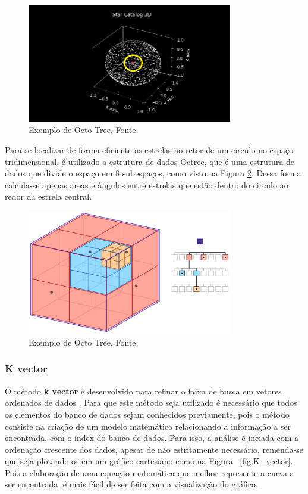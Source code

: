 \begin{figure}[H]
    \centering
    \includegraphics[width=0.8\textwidth]{images/estrelas_endorno.png}
    \caption{Exemplo de Octo Tree, Fonte: \cite{octo_tree}}
    \label{fig:estrelas_endorno}
\end{figure}

Para se localizar de forma eficiente as estrelas ao retor de um circulo no espaço tridimensional, é utilizado a estrutura de dados Octree,
que é uma estrutura de dados que divide o espaço em 8 subespaços, como visto na Figura \ref{fig:octo_tree}. 
Dessa forma calcula-se apenas areas e ângulos entre estrelas que estão dentro do circulo ao redor da estrela central.

\begin{figure}[H]
    \centering
    \includegraphics[width=0.8\textwidth]{images/octree.png}
    \caption{Exemplo de Octo Tree, Fonte: \cite{octo_tree}}
    \label{fig:octo_tree}
\end{figure}

\subsubsection{K vector}

O método \textbf{k vector} é desenvolvido para refinar o faixa de busca em vetores ordenados de dados \cite{Mortari}.
Para que este método seja utilizado é necessário que todos os elementos do banco de dados sejam conhecidos previamente, 
pois o método consiste na criação de um modelo matemático relacionando a informação a ser encontrada, com o index do banco de dados.
Para isso,  a análise é inciada com a ordenação crescente dos dados, 
apesar de não estritamente necessário, remenda-se que seja plotando os em um  gráfico cartesiano como na Figura ~\ref{fig:K_vector}.
Pois a elaboração de uma equação matemática que melhor represente a curva a ser encontrada, é mais fácil de ser feita com a visualização do gráfico.


